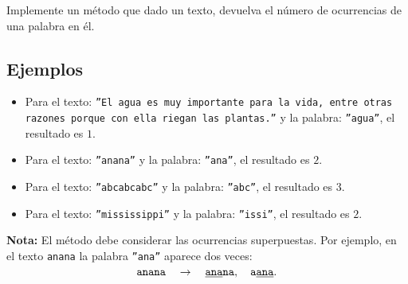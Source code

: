 Implemente un método que dado un texto, devuelva el número de ocurrencias de una palabra en él.

\subsection*{Ejemplos}

\begin{itemize}
    \item Para el texto: \texttt{''El agua es muy importante para la vida, entre otras razones porque con ella riegan las plantas.''}  
    y la palabra: \texttt{''agua''}, el resultado es \(1\).

    \item Para el texto: \texttt{''anana''}  
    y la palabra: \texttt{''ana''}, el resultado es \(2\).

    \item Para el texto: \texttt{''abcabcabc''}  
    y la palabra: \texttt{''abc''}, el resultado es \(3\).

    \item Para el texto: \texttt{''mississippi''}  
    y la palabra: \texttt{''issi''}, el resultado es \(2\). 
\end{itemize}

\textbf{Nota:} El método debe considerar las ocurrencias superpuestas. Por ejemplo, en el texto \texttt{anana} la palabra \texttt{''ana''} aparece dos veces:  
\[
\texttt{anana} \quad \rightarrow \quad \texttt{\underline{ana}na}, \quad \texttt{a\underline{ana}}.
\]
